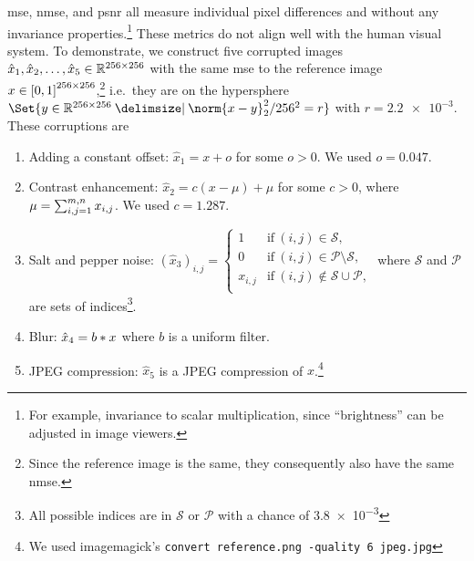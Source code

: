 \Gls{mse}, \gls{nmse}, and \gls{psnr} all measure individual pixel differences and without any invariance properties.\footnote{%
	For example, invariance to scalar multiplication, since \enquote{brightness} can be adjusted in image viewers.
}
These metrics do not align well with the human visual system.
To demonstrate, we construct five corrupted images \( \hat{x}_{\num{1}},\hat{x}_{\num{2}},\dotsc,\hat{x}_{\num{5}} \in \R^{\numproduct{256x256}} \) with the same \gls{mse} to the reference image \( x \in \interval{\num{0}}{\num{1}}^{\numproduct{256x256}} \),\footnote{%
	Since the reference image is the same, they consequently also have the same \gls{nmse}.
} i.e.\ they are on the hypersphere \( \Set{y \in \R^{\numproduct{256x256}} \given \norm{x - y}_{\num{2}}^{\num{2}}/\num{256}^{\num{2}} = r} \) with \( r = \num{2.2e-3} \).
These corruptions are
\begin{enumerate}
	\item Adding a constant offset:
		\( \hat{x}_{\num{1}} = x + o \) for some \( o > \num{0} \).
		We used \( o = \num{0.047} \).
	\item Contrast enhancement:
		\( \hat{x}_{\num{2}} = c(x - \mu) + \mu \) for some \( c > \num{0} \), where \( \mu = \sum_{i,j=1}^{m,n} x_{i,j} \).
		We used \( c = \num{1.287} \).
	\item Salt and pepper noise: \( (\hat{x}_{\num{3}})_{i, j} = \begin{cases}
			\num{1} & \text{if}\ (i, j) \in \mathcal{S}, \\
			\num{0} & \text{if}\ (i, j) \in \mathcal{P} \setminus \mathcal{S}, \\
			x_{i, j} & \text{if}\ (i, j) \notin \mathcal{S} \cup \mathcal{P}, \\
		\end{cases} \) where \( \mathcal{S} \) and \( \mathcal{P} \) are sets of indices\footnote{All possible indices are in \( \mathcal{S} \) or \( \mathcal{P} \) with a chance of \num{3.8e-3}}.
	\item Blur: \( \hat{x}_4 = b\mathbin{*}x \) where \( b \) is a  uniform filter.
	\item JPEG compression: \( \hat{x}_{\num{5}} \) is a JPEG compression of \( x \).\footnote{We used imagemagick's \texttt{convert reference.png -quality 6 jpeg.jpg}}
\end{enumerate}

